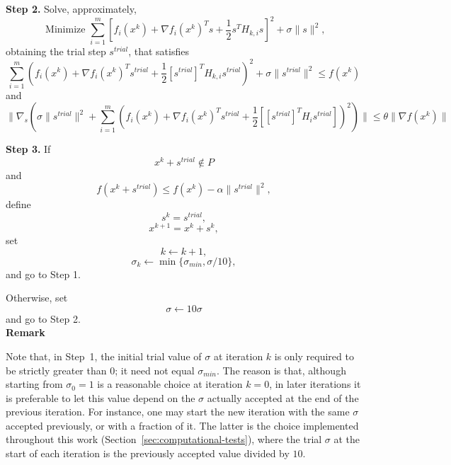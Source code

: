 \documentclass{article}
\newcommand{\half}      {\frac{1}{2}}
\begin{document}
\noindent
{\bf Step 2.} Solve, approximately,
\begin{equation} \label{regsub}
\mbox{ Minimize } \sum_{i=1}^m [f_i(x^k) + \nabla f_i(x^k)^T s + \half s^T H_{k,i} s]^2 + \sigma \|s\|^2,
\end{equation}
obtaining the trial step $s^{trial}$, that satisfies
 \begin{equation} \label{bajomo}
\sum_{i=1}^m (f_i(x^k) + \nabla f_i(x^k)^T s^{trial} + \half [s^{trial}]^T H_{k,i} s^{trial})^2 + \sigma \|s^{trial}\|^2 \leq f(x^k)
\end{equation}  
 and
 \begin{equation} \label{gcero}
\|  \nabla_s \left(\sigma \|s^{trial}\|^2 +
 \sum_{i=1}^m (f_i(x^k) + \nabla f_i(x^k)^T s^{trial} + \half [[s^{trial}]^T H_i s^{trial}])^2 \right) \|
   \leq \theta \|\nabla f(x^k)\|
\end{equation} 
 
 

\noindent
{\bf Step 3.} If 
\begin{equation} \label{feasi}
x^k + s^{trial} \notin P
\end{equation}
and
\begin{equation} \label{armial}
f(x^k + s^{trial}) \leq f(x^k) - \alpha \|s^{trial}\|^2,
\end{equation}
define
\begin{equation} \label{stsk}
s^k = s^{trial},
\end{equation}
\begin{equation} \label{novox}
x^{k + 1} = x^k + s^k, 
\end{equation}
set 
\begin{equation} \label{next}
k \leftarrow k+1,
\end{equation}
\begin{equation} \label{sigmak}
\sigma_k \leftarrow \min \{\sigma_{min}, \sigma/10\},
\end{equation}
and go to Step 1.

Otherwise, set
\begin{equation} \label{upsig}
\sigma \leftarrow  10 \sigma %
\end{equation}
and go to Step 2.\\  

 
\noindent
{\bf Remark}

Note that, in Step~1, the initial trial value of $\sigma$ at iteration $k$ is only required to be strictly greater
 than $0$; it need not equal $\sigma_{min}$. The reason is that, although starting from $\sigma_0 = 1$ is a reasonable
 choice at iteration $k=0$, in later iterations it is preferable to let this value depend on the $\sigma$ actually accepted
 at the end of the previous iteration. For instance, one may start the new iteration with the same $\sigma$ accepted
 previously, or with a fraction of it. The latter is the choice implemented throughout this work (Section~\ref{sec:computational-tests}),
 where the trial $\sigma$ at the start of each iteration is the previously accepted value divided by $10$.\\
\end{document}
